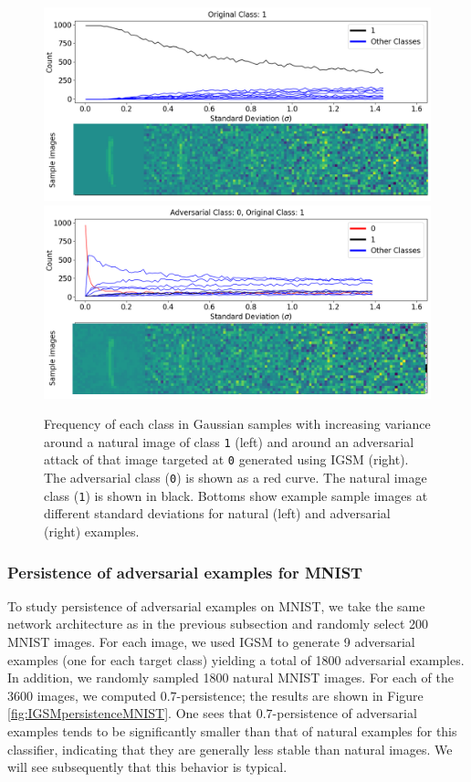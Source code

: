 \begin{figure}[!ht]
  \includegraphics[width = .49\textwidth]{c3_figures/MNIST1.png}
  \includegraphics[width = .49\textwidth]{c3_figures/MNIST10.png}
\caption{Frequency of each class in Gaussian samples with increasing variance around a natural image of class \texttt{1} (left) and around an adversarial attack of that image targeted at \texttt{0} generated using IGSM (right). The adversarial class (\texttt{0}) is shown as a red curve. The natural image class (\texttt{1}) is shown in black. Bottoms show example sample images at different standard deviations for natural (left) and adversarial (right) examples.}\label{fgsmo}
\end{figure}

\subsubsection{Persistence of adversarial examples for MNIST}

To study persistence of adversarial examples on MNIST, we take the same network architecture as in the previous subsection and randomly select 200 MNIST images. For each image, we used IGSM to generate 9 adversarial examples (one for each target class) yielding a total of 1800 adversarial examples. In addition, we randomly sampled 1800 natural MNIST images. For each of the 3600 images, we computed $0.7$-persistence; the results are shown in Figure \ref{fig:IGSMpersistenceMNIST}. One sees that $0.7$-persistence of adversarial examples tends to be significantly smaller than that of natural examples for this classifier, indicating that they are generally less stable than natural images. We will see subsequently that this behavior is typical.

